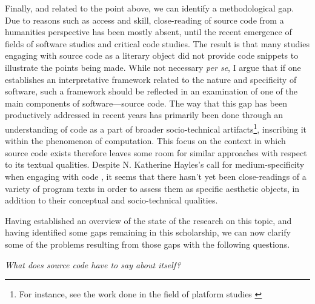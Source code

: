 Finally, and related to the point above, we can identify a methodological gap. Due to reasons such as access and skill, close-reading of source code from a humanities perspective has been mostly absent, until the recent emergence of fields of software studies and critical code studies. The result is that many studies engaging with source code as a literary object did not provide code snippets to illustrate the points being made. While not necessary \emph{per se}, I argue that if one establishes an interpretative framework related to the nature and specificity of software, such a framework should be reflected in an examination of one of the main components of software—source code. The way that this gap has been productively addressed in recent years has primarily been done through an understanding of code as a part of broader socio-technical artifacts\footnote{For instance, see the work done in the field of platform studies \citep{montfort_10_2014}}, inscribing it within the phenomenon of computation. This focus on the context in which source code exists therefore leaves some room for similar approaches with respect to its textual qualities. Despite N. Katherine Hayles's call for medium-specificity when engaging with code \citep{hayles_print_2004}, it seems that there hasn't yet been close-readings of a variety of program texts in order to assess them as specific aesthetic objects, in addition to their conceptual and socio-technical qualities.

Having established an overview of the state of the research on this topic, and having identified some gaps remaining in this scholarship, we can now clarify some of the problems resulting from those gaps with the following questions.

\vspace*{1\baselineskip}

\emph{What does source code have to say about itself?}

